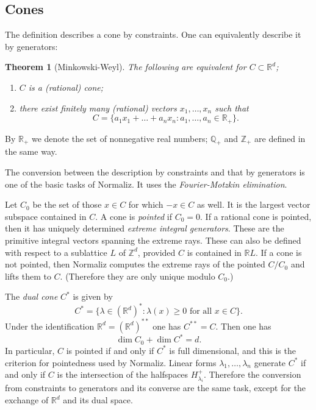 \documentclass[12pt,a4paper]{scrartcl}
\newtheorem{theorem}{Theorem}
\theoremstyle{definition}
\def\ZZ{{\mathbb Z}}
\def\QQ{{\mathbb Q}}
\def\RR{{\mathbb R}}
\begin{document}
\subsection{Cones}

The definition describes a cone by constraints. One can equivalently describe it by generators:

\begin{theorem}[Minkowski-Weyl]
	The following are equivalent for $C\subset\RR^d$;
	\begin{enumerate}
		\item $C$ is a (rational) cone;
		\item there exist finitely many (rational) vectors $x_1,\dots,x_n$ such that
		$$
		C=\{a_1x_1+\dots+a_nx_n:a_1,\dots,a_n\in\RR_+\}.
		$$
	\end{enumerate}
\end{theorem}

By $\RR_+$ we denote the set of nonnegative real numbers; $\QQ_+$ and $\ZZ_+$ are defined in the same way.

The conversion between the description by constraints and that by generators is one of the basic tasks of Normaliz. It uses the \emph{Fourier-Motzkin elimination}.

Let $C_0$ be the set of those $x\in C$ for which $-x\in C$ as well. It is the largest vector subspace contained in $C$. 
A cone is \emph{pointed} if $C_0=0$. If a rational cone is pointed, then it has uniquely determined \emph{extreme integral generators}. These are the primitive integral vectors spanning the extreme rays. These can also be defined with respect to a sublattice $L$ of $\ZZ^d$, provided $C$ is contained in $\RR L$. If a cone is not pointed, then Normaliz computes the extreme rays of the pointed $C/C_0$ and lifts them to $C$. (Therefore they are only unique modulo $C_0$.)

The \emph{dual cone} $C^*$ is given by
$$
C^*=\{\lambda\in (\RR^d)^*:\lambda(x)\ge0 \text{ for all } x\in C\}.
$$
Under the identification $\RR^d=(\RR^d)^{**}$ one has $C^{**}=C$. Then one has
$$
\dim C_0+\dim C^*=d.
$$
In particular, $C$ is pointed if and only if $C^*$ is full dimensional, and this is the criterion for pointedness used by Normaliz. Linear forms $\lambda_1,\dots,\lambda_n$ generate $C^*$ if and only if $C$ is the intersection of the halfspaces $H_{\lambda_i}^+$. Therefore the conversion from constraints to generators and its converse are the same task, except for the exchange of $\RR^d$ and its dual space.
\end{document}
